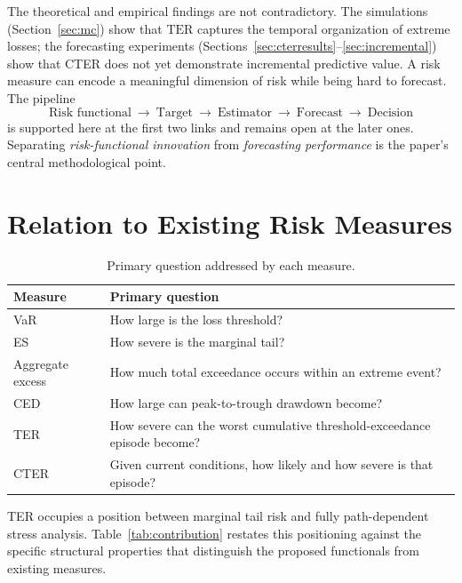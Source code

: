 \documentclass[11pt]{article}
\newcommand{\TER}{\mathrm{TER}}
\begin{document}
The theoretical and empirical findings are not contradictory. The simulations (Section~\ref{sec:mc}) show
that $\TER$ captures the temporal organization of extreme losses; the forecasting experiments
(Sections~\ref{sec:cterresults}--\ref{sec:incremental}) show that CTER does not yet demonstrate incremental
predictive value. A risk measure can encode a meaningful dimension of risk while being hard to forecast.
The pipeline
\[
\text{Risk functional}\ \to\ \text{Target}\ \to\ \text{Estimator}\ \to\ \text{Forecast}\ \to\ \text{Decision}
\]
is supported here at the first two links and remains open at the later ones. Separating
\emph{risk-functional innovation} from \emph{forecasting performance} is the paper's central methodological
point.

\section{Relation to Existing Risk Measures}\label{sec:relation}

\begin{table}[h]
\centering
\caption{Primary question addressed by each measure.}
\label{tab:relation}
\begin{tabular}{ll}
\toprule
Measure & Primary question \\
\midrule
VaR & How large is the loss threshold? \\
ES & How severe is the marginal tail? \\
Aggregate excess & How much total exceedance occurs within an extreme event? \\
CED & How large can peak-to-trough drawdown become? \\
TER & How severe can the worst cumulative threshold-exceedance episode become? \\
CTER & Given current conditions, how likely and how severe is that episode? \\
\bottomrule
\end{tabular}
\end{table}
\noindent TER occupies a position between marginal tail risk and fully path-dependent stress analysis.
Table~\ref{tab:contribution} restates this positioning against the specific structural properties that
distinguish the proposed functionals from existing measures.
\end{document}
